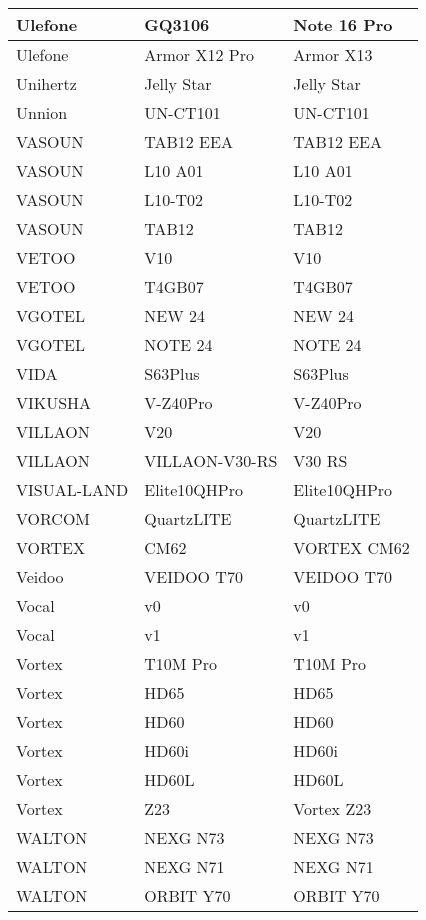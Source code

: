 \begin{tabularx}{\linewidth}{|l|X|X|}
        Ulefone & GQ3106 & Note 16 Pro \\ \hline
        Ulefone & Armor X12 Pro & Armor X13 \\ \hline
        Unihertz & Jelly Star & Jelly Star \\ \hline
        Unnion & UN-CT101 & UN-CT101 \\ \hline
        VASOUN & TAB12 EEA & TAB12 EEA \\ \hline
        VASOUN & L10 A01 & L10 A01 \\ \hline
        VASOUN & L10-T02 & L10-T02 \\ \hline
        VASOUN & TAB12 & TAB12 \\ \hline
        VETOO & V10 & V10 \\ \hline
        VETOO & T4GB07 & T4GB07 \\ \hline
        VGOTEL & NEW 24 & NEW 24 \\ \hline
        VGOTEL & NOTE 24 & NOTE 24 \\ \hline
        VIDA & S63Plus & S63Plus \\ \hline
        VIKUSHA & V-Z40Pro & V-Z40Pro \\ \hline
        VILLAON & V20 & V20 \\ \hline
        VILLAON & VILLAON-V30-RS & V30 RS \\ \hline
        VISUAL-LAND & Elite10QHPro & Elite10QHPro \\ \hline
        VORCOM & QuartzLITE & QuartzLITE \\ \hline
        VORTEX & CM62 & VORTEX CM62 \\ \hline
        Veidoo & VEIDOO T70 & VEIDOO T70 \\ \hline
        Vocal & v0 & v0 \\ \hline
        Vocal & v1 & v1 \\ \hline
        Vortex & T10M Pro & T10M Pro \\ \hline
        Vortex & HD65 & HD65 \\ \hline
        Vortex & HD60 & HD60 \\ \hline
        Vortex & HD60i & HD60i \\ \hline
        Vortex & HD60L & HD60L \\ \hline
        Vortex & Z23 & Vortex Z23 \\ \hline
        WALTON & NEXG N73 & NEXG N73 \\ \hline
        WALTON & NEXG N71 & NEXG N71 \\ \hline
        WALTON & ORBIT Y70 & ORBIT Y70 \\ \hline

\end{tabularx}
